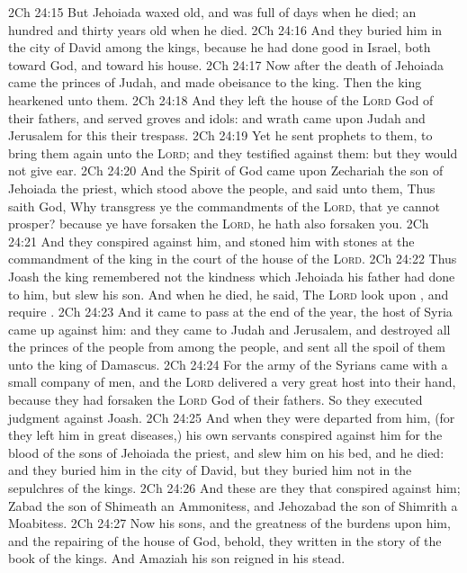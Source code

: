 \vs 2Ch 24:15 But Jehoiada waxed old, and was full of days when he died; an hundred and thirty years old  when he died.
\vs 2Ch 24:16 And they buried him in the city of David among the kings, because he had done good in Israel, both toward God, and toward his house.
\vs 2Ch 24:17 Now after the death of Jehoiada came the princes of Judah, and made obeisance to the king. Then the king hearkened unto them.
\vs 2Ch 24:18 And they left the house of the \textsc{Lord} God of their fathers, and served groves and idols: and wrath came upon Judah and Jerusalem for this their trespass.
\vs 2Ch 24:19 Yet he sent prophets to them, to bring them again unto the \textsc{Lord}; and they testified against them: but they would not give ear.
\vs 2Ch 24:20 And the Spirit of God came upon Zechariah the son of Jehoiada the priest, which stood above the people, and said unto them, Thus saith God, Why transgress ye the commandments of the \textsc{Lord}, that ye cannot prosper? because ye have forsaken the \textsc{Lord}, he hath also forsaken you.
\vs 2Ch 24:21 And they conspired against him, and stoned him with stones at the commandment of the king in the court of the house of the \textsc{Lord}.
\vs 2Ch 24:22 Thus Joash the king remembered not the kindness which Jehoiada his father had done to him, but slew his son. And when he died, he said, The \textsc{Lord} look upon , and require .
\vs 2Ch 24:23 And it came to pass at the end of the year,  the host of Syria came up against him: and they came to Judah and Jerusalem, and destroyed all the princes of the people from among the people, and sent all the spoil of them unto the king of Damascus.
\vs 2Ch 24:24 For the army of the Syrians came with a small company of men, and the \textsc{Lord} delivered a very great host into their hand, because they had forsaken the \textsc{Lord} God of their fathers. So they executed judgment against Joash.
\vs 2Ch 24:25 And when they were departed from him, (for they left him in great diseases,) his own servants conspired against him for the blood of the sons of Jehoiada the priest, and slew him on his bed, and he died: and they buried him in the city of David, but they buried him not in the sepulchres of the kings.
\vs 2Ch 24:26 And these are they that conspired against him; Zabad the son of Shimeath an Ammonitess, and Jehozabad the son of Shimrith a Moabitess.
\vs 2Ch 24:27 Now  his sons, and the greatness of the burdens  upon him, and the repairing of the house of God, behold, they  written in the story of the book of the kings. And Amaziah his son reigned in his stead.
